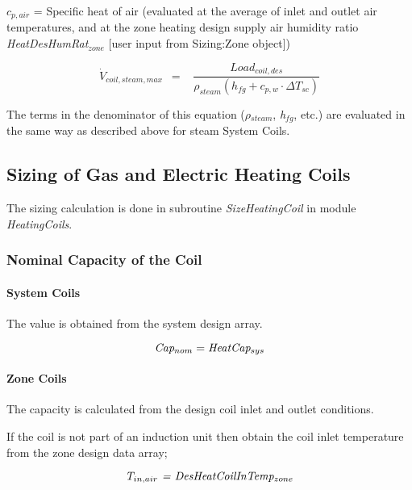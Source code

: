 \({c_{p,air}}\) = Specific heat of air (evaluated at the average of inlet and outlet air temperatures, and at the zone heating design supply air humidity ratio \emph{HeatDesHumRat\(_{zone}\)} {[}user input from Sizing:Zone object{]})

\begin{equation}
{\dot V_{coil,steam,max}}\,\,\, = \,\,\,\,\,\frac{{Loa{d_{coil,des}}}}{{{\rho_{steam}}\left( {{h_{fg}} + {c_{p,w}}\cdot \Delta {T_{sc}}} \right)}}
\end{equation}

The terms in the denominator of this equation (\emph{\(\rho\)\(_{steam}\)}, \emph{h\(_{fg}\)}, etc.) are evaluated in the same way as described above for steam System Coils.

\subsection{Sizing of Gas and Electric Heating Coils}\label{sizing-of-gas-and-electric-heating-coils}

The sizing calculation is done in subroutine \emph{SizeHeatingCoil} in module \emph{HeatingCoils}.

\subsubsection{Nominal Capacity of the Coil}\label{nominal-capacity-of-the-coil}

\paragraph{System Coils}\label{system-coils-3}

The value is obtained from the system design array.

\begin{equation}
\emph{Cap\(_{nom}\)} = \emph{HeatCap\(_{sys}\)}
\end{equation}

\paragraph{Zone Coils}\label{zone-coils-3}

The capacity is calculated from the design coil inlet and outlet conditions.

If the coil is not part of an induction unit then obtain the coil inlet temperature from the zone design data array;

\begin{equation}
\emph{T\(_{in,air}\) = DesHeatCoilInTemp\(_{zone}\)}
\end{equation}

